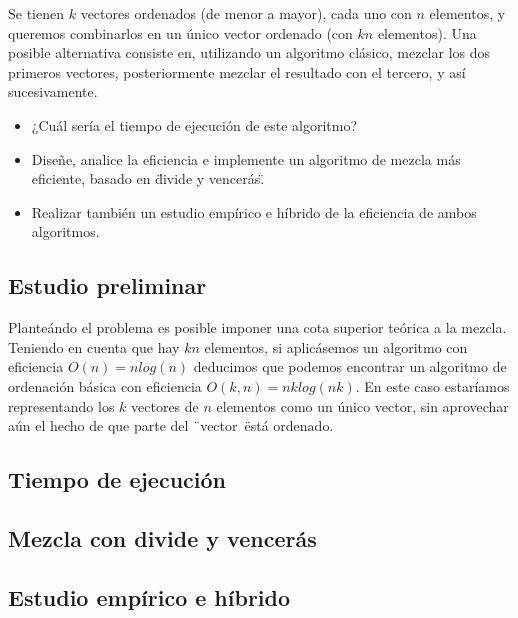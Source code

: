 
Se tienen $k$ vectores ordenados (de menor a mayor), cada uno con $n$ elementos, y queremos
combinarlos en un \'unico vector ordenado (con $kn$ elementos). Una posible alternativa consiste en, utilizando un algoritmo cl\'asico, mezclar los dos primeros vectores, posteriormente mezclar el resultado con el tercero, y as\'i sucesivamente.

\begin{itemize}
    \item ¿Cu\'al ser\'ia el tiempo de ejecuci\'on de este algoritmo?
	\item Diseñe, analice la eficiencia e implemente un algoritmo de mezcla m\'as eficiente, 		  basado en \"divide y vencer\'as\".
	\item Realizar tambi\'en un estudio emp\'irico e h\'ibrido de la eficiencia de ambos 				  algoritmos.
\end{itemize}

\subsection{Estudio preliminar}
Plante\'ando el problema es posible imponer una cota superior te\'orica a la mezcla. Teniendo en cuenta que hay $kn$ elementos, si aplic\'asemos un algoritmo con eficiencia  $O(n)=nlog(n)$ deducimos que podemos encontrar un algoritmo de ordenaci\'on b\'asica con eficiencia $O(k,n)=nklog(nk)$. En este caso estar\'iamos representando los $k$ vectores de $n$ elementos como un \'unico vector, sin aprovechar a\'un el hecho de que parte del \"\ vector\ \" est\'a ordenado.

\subsection{Tiempo de ejecuci\'on}
\subsection{Mezcla con divide y vencer\'as}
\subsection{Estudio emp\'irico e h\'ibrido}
